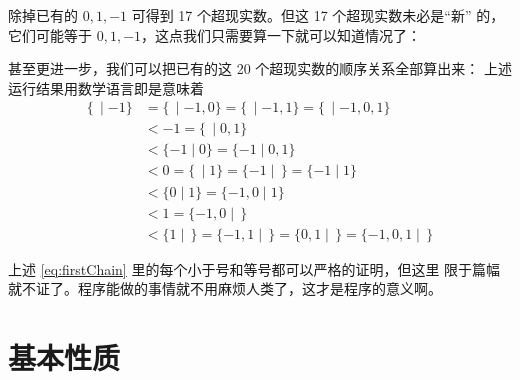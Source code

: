 \documentclass[cs4size,a4paper,adobefonts]{ctexart}
\numberwithin{equation}{section}
\begin{document}
除掉已有的 $0,1,-1$ 可得到 17 个超现实数。但这 17 个超现实数未必是“新”
的，它们可能等于 $0,1,-1$，这点我们只需要算一下就可以知道情况了：

甚至更进一步，我们可以把已有的这 20 个超现实数的顺序关系全部算出来：
上述运行结果用数学语言即是意味着
\begin{equation}
  \label{eq:firstChain}
  \begin{split}
    \{\,\mid-1\} &=\{\,\mid-1,0\}=\{\,\mid-1,1\}=\{\,\mid-1,0,1\} \\
    &< -1 =\{\,\mid0,1\}\\
    &< \{-1\mid0\}=\{-1\mid0,1\}\\
    &< 0=\{\,\mid1\}=\{-1\mid\,\}=\{-1\mid1\}\\
    &< \{0\mid1\}=\{-1,0\mid1\}\\
    &< 1=\{-1,0\mid\,\}\\
    &< \{1\mid\,\}=\{-1,1\mid\,\}=\{0,1\mid\,\}=\{-1,0,1\mid\,\}
  \end{split}
\end{equation}

上述 \eqref{eq:firstChain} 里的每个小于号和等号都可以严格的证明，但这里
限于篇幅就不证了。程序能做的事情就不用麻烦人类了，这才是程序的意义啊。

\section{基本性质}
\end{document}
